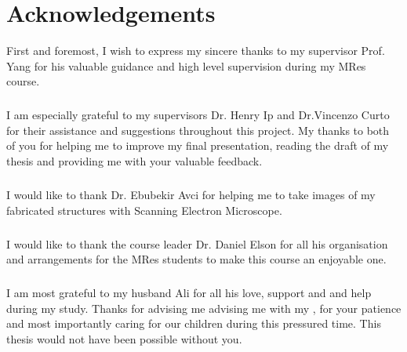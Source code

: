 \documentclass[12pt,a4paper,titlepage]{report}
\begin{document}


\setcounter{page}{1}
\thispagestyle{plain}
\chapter*{Acknowledgements}

First and foremost, I wish to express my sincere thanks to my supervisor Prof. Yang for his valuable guidance 
and high level supervision during my MRes course.

\paragraph{}
I am especially grateful to my supervisors Dr. Henry Ip and Dr.Vincenzo Curto for their assistance 
and suggestions throughout this project. My thanks to both of you for helping me to improve my final presentation, 
reading the draft of my thesis and providing me with your valuable feedback.

\paragraph{}
I would like to thank Dr. Ebubekir Avci for helping me to take images of my fabricated structures with 
Scanning Electron Microscope.

\paragraph{}
I would like to thank the course leader Dr. Daniel Elson for all his organisation and arrangements
 for the MRes students to make this course an enjoyable one.

\paragraph{}
  I am most grateful to my husband Ali for all his love, support and and help during 
my study. Thanks for advising me advising me with my , for your patience 
 and most importantly caring for our children during this pressured time. This thesis would not 
have been possible without you.
\end{document}

